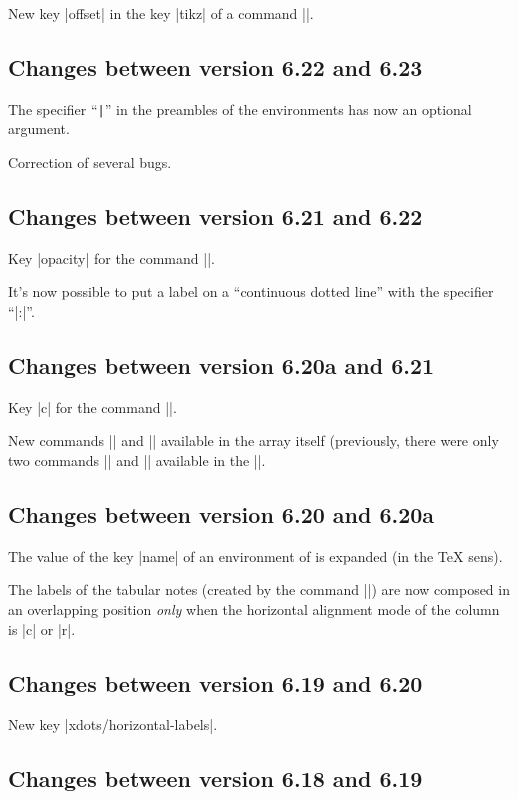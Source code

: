 \documentclass[dvipsnames]{article}%
\begin{document}
New key |offset| in the key |tikz| of a command |\Block|.


\subsection*{Changes between version 6.22 and 6.23}

The specifier ``\verb+|+'' in the preambles of the environments has now an
optional argument.

Correction of several bugs.

\subsection*{Changes between version 6.21 and 6.22}

Key |opacity| for the command |\Block|.

It's now possible to put a label on a ``continuous dotted line'' with the
specifier ``|:|''.


\subsection*{Changes between version 6.20a and 6.21}

Key |c| for the command |\tabularnote|.

New commands |\rowcolors| and |\rowlistcolors| available in the array itself
(previously, there were only two commands |\rowcolors| and |\rowlistcolors|
available in the |\CodeBefore|.


\subsection*{Changes between version 6.20 and 6.20a}

The value of the key |name| of an environment of  is expanded
(in the TeX sens).

The labels of the tabular notes (created by the command |\tabularnote|) are now
composed in an overlapping position \emph{only} when the horizontal alignment
mode of the column is |c| or |r|.

\subsection*{Changes between version 6.19 and 6.20}

New key |xdots/horizontal-labels|.

\subsection*{Changes between version 6.18 and 6.19}
\end{document}
